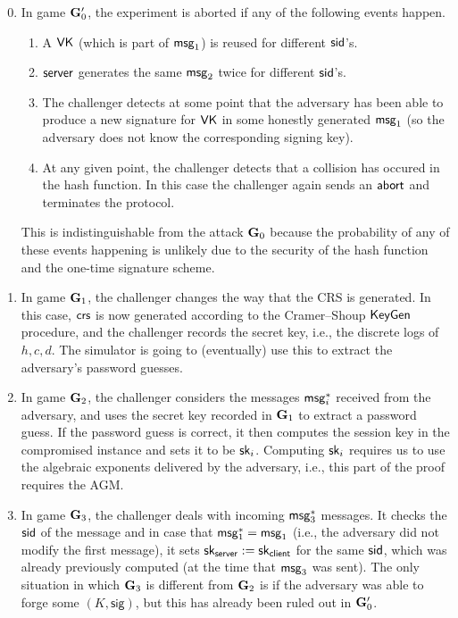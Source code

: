 \begin{enumerate}
\setcounter{enumi}{-1}
	\item In game $\mathbf{G}_0'$, the experiment is aborted if any of the following events happen.
	\begin{enumerate}
		\item A $\mathsf{VK}$ (which is part of $\mathsf{msg}_{1}$) is reused for different $\mathsf{sid}$'s.
		\item $\mathsf{server}$ generates the same $\mathsf{msg}_{2}$ twice for different $\mathsf{sid}$'s.
		\item The challenger detects at some point that the adversary has been able to produce a new signature for $\mathsf{VK}$ in some honestly generated $\mathsf{msg}_{1}$ (so the adversary does not know the corresponding signing key).
		\item At any given point, the challenger detects that a collision has occured in the hash function. In this case the challenger again sends an $\mathsf{abort}$ and terminates the protocol.
	\end{enumerate}
	This is indistinguishable from the attack $\mathbf{G}_0$ because the probability of any of these events happening is unlikely due to the security of the hash function and the one-time signature scheme.
	
	\item In game $\mathbf{G}_1$, the challenger changes the way that the CRS is generated. In this case, $\mathsf{crs}$ is now generated according to the Cramer--Shoup $\mathsf{KeyGen}$ procedure, and the challenger records the secret key, i.e., the discrete logs of $h, c, d$. The simulator is going to (eventually) use this to extract the adversary's password guesses.
	
	\item In game $\mathbf{G}_2$, the challenger considers the messages $\mathsf{msg}_{i}^{*}$ received from the adversary, and uses the secret key recorded in $\mathbf{G}_1$ to extract a password guess. If the password guess is correct, it then computes the session key in the compromised instance and sets it to be $\mathsf{sk}_i$. Computing $\mathsf{sk}_i$ requires us to use the algebraic exponents delivered by the adversary, i.e., this part of the proof requires the AGM.
	
	\item In game $\mathbf{G}_3$, the challenger deals with incoming $\mathsf{msg}_{3}^{*}$ messages. It checks the $\mathsf{sid}$ of the message and in case that $\mathsf{msg}_{1}^{*} = \mathsf{msg}_{1}$ (i.e., the adversary did not modify the first message), it sets $\mathsf{sk}_{\mathsf{server}}:=\mathsf{sk}_{\mathsf{client}}$ for the same $\mathsf{sid}$, which was already previously computed (at the time that $\mathsf{msg}_{3}$ was sent). The only situation in which $\mathbf{G}_3$ is different from $\mathbf{G}_2$ is if the adversary was able to forge some $(K,\mathsf{sig})$, but this has already been ruled out in $\mathbf{G}_0'$.
	

\end{enumerate}
